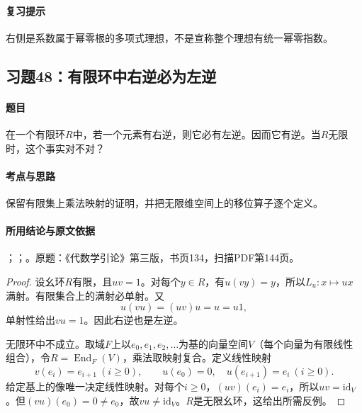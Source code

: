 \paragraph{复习提示}

右侧是系数属于幂零根的多项式理想，不是宣称整个理想有统一幂零指数。



\subsection{习题48：有限环中右逆必为左逆}

\label{ex:3:48}

\paragraph{题目}

在一个有限环$R$中，若一个元素有右逆，则它必有左逆。因而它有逆。当$R$无限时，这个事实对不对？

\paragraph{考点与思路}

保留有限集上乘法映射的证明，并把无限维空间上的移位算子逐个定义。

\paragraph{所用结论与原文依据}

；；。原题：《代数学引论》第三版，书页134，扫描PDF第144页。


\begin{proof}

设幺环$R$有限，且$uv=1$。对每个$y\in R$，有$u(vy)=y$，所以$L_u:x\mapsto ux$满射。有限集合上的满射必单射。又
\[
u(vu)=(uv)u=u=u1,
\]
单射性给出$vu=1$。因此右逆也是左逆。

无限环中不成立。取域$F$上以$e_0,e_1,e_2,\ldots$为基的向量空间$V$（每个向量为有限线性组合），令$R=\operatorname{End}_F(V)$，乘法取映射复合。定义线性映射
\[
v(e_i)=e_{i+1}\ (i\ge0),\qquad u(e_0)=0,\quad u(e_{i+1})=e_i\ (i\ge0).
\]
给定基上的像唯一决定线性映射。对每个$i\ge0$，$(uv)(e_i)=e_i$，所以$uv=\mathrm{id}_V$。但$(vu)(e_0)=0\ne e_0$，故$vu\ne\mathrm{id}_V$。$R$是无限幺环，这给出所需反例。

\end{proof}

